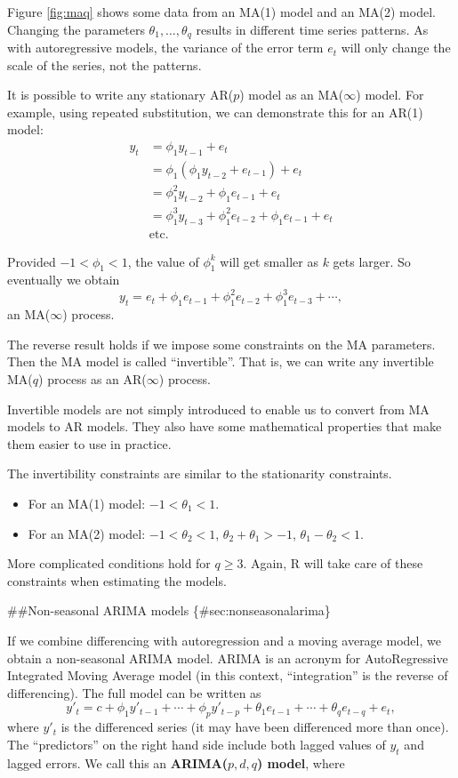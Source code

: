 \documentclass[]{book}
\providecommand{\tightlist}{%
  \setlength{\itemsep}{0pt}\setlength{\parskip}{0pt}}
\begin{document}
Figure \ref{fig:maq} shows some data from an MA(1) model and an MA(2) model. Changing the parameters \(\theta_1,\dots,\theta_q\) results in different time series patterns. As with autoregressive models, the variance of the error term \(e_t\) will only change the scale of the series, not the patterns.

It is possible to write any stationary AR(\(p\)) model as an MA(\(\infty\)) model. For example, using repeated substitution, we can demonstrate this for an AR(1) model:
\begin{align*}
y_t &= \phi_1y_{t-1} + e_t\\
&= \phi_1(\phi_1y_{t-2} + e_{t-1}) + e_t\\
&= \phi_1^2y_{t-2} + \phi_1 e_{t-1} + e_t\\
&= \phi_1^3y_{t-3} + \phi_1^2e_{t-2} + \phi_1 e_{t-1} + e_t\\
&\text{etc.}
\end{align*}

Provided \(-1 < \phi_1 < 1\), the value of \(\phi_1^k\) will get smaller as \(k\) gets larger. So eventually we obtain
\[
  y_t = e_t + \phi_1 e_{t-1} + \phi_1^2 e_{t-2} + \phi_1^3 e_{t-3} + \cdots,
\]
an MA(\(\infty\)) process.

The reverse result holds if we impose some constraints on the MA parameters. Then the MA model is called ``invertible''. That is, we can write any invertible MA(\(q\)) process as an AR(\(\infty\)) process.

Invertible models are not simply introduced to enable us to convert from MA models to AR models. They also have some mathematical properties that make them easier to use in practice.

The invertibility constraints are similar to the stationarity constraints.

\begin{itemize}
\tightlist
\item
  For an MA(1) model: \(-1<\theta_1<1\).
\item
  For an MA(2) model: \(-1<\theta_2<1\), \(\theta_2+\theta_1 >-1\), \(\theta_1 -\theta_2 < 1\).
\end{itemize}

More complicated conditions hold for \(q\ge3\). Again, R will take care of these constraints when estimating the models.

\#\#Non-seasonal ARIMA models \{\#sec:nonseasonalarima\}

If we combine differencing with autoregression and a moving average model, we obtain a non-seasonal ARIMA model. ARIMA is an acronym for AutoRegressive Integrated Moving Average model (in this context, ``integration'' is the reverse of differencing). The full model can be written as
\begin{equation}
  y'_{t} = c + \phi_{1}y'_{t-1} + \cdots + \phi_{p}y'_{t-p}
     + \theta_{1}e_{t-1} + \cdots + \theta_{q}e_{t-q} + e_{t},  \label{eq:8-arima}
\end{equation}
where \(y'_{t}\) is the differenced series (it may have been differenced more than once). The ``predictors'' on the right hand side include both lagged values of \(y_t\) and lagged errors. We call this an \textbf{ARIMA(\(p, d, q\)) model}, where
\end{document}
